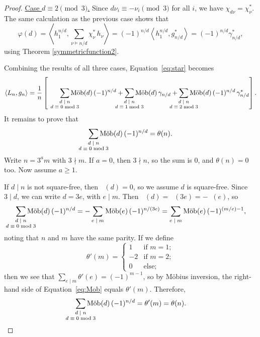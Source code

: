 \documentclass[12pt]{article}
\DeclareMathOperator{\mob}{M\ddot{o}b}
\newcommand{\gam}{\gamma}
\newcommand{\ee}{\chi}
\theoremstyle{definition}
\begin{document}
\begin{proof}
\noindent\underline{Case $d \equiv 2 \pmod{3}$.} Since $d\nu_i \equiv -\nu_i \pmod{3}$ for all $i$, we have $\ee_{d\nu} = \ee_{\nu}^*$. The same calculation as the previous case shows that
\[ \varphi(d) = \left\langle h_1^{n/d}, \sum_{\nu \vDash n/d} \ee_\nu^* \,h_\nu \right\rangle = (-1)^{n/d} \left\langle h_1^{n/d}, g_{n/d}^* \right\rangle= (-1)^{n/d} \gam_{n/d}^*, \]
using Theorem \ref{symmetricfunction2}.

Combining the results of all three cases, Equation~\eqref{eq:star} becomes
\[ \left\langle L_n, g_n \right\rangle = \frac{1}{n} \left[ \hspace{.25in} \sum_{\mathclap{\substack{\text{$d \mid n$}\\ \text{$d \equiv 0\bmod 3$}}}} \mob(d)\,(-1)^{n/d} + \sum_{\mathclap{\substack{\text{$d \mid n$}\\ \text{$d \equiv 1\bmod 3$}}}} \mob(d)\, \gam_{n/d} + \sum_{\mathclap{\substack{\text{$d \mid n$}\\ \text{$d \equiv 2\bmod 3$}}}} \mob(d)\, (-1)^{n/d}\, \gam_{n/d}^*\right]. \]
It remains to prove that
\[ \sum_{\mathclap{\substack{\text{$d \mid n$}\\ \text{$d \equiv 0\bmod 3$}}}} \mob(d)\,(-1)^{n/d} = \theta(n). \]
Write $n = 3^a m$ with $3\nmid m$. If $a = 0$, then $3\nmid n$, so the sum is $0$, and $\theta(n) = 0$ too. Now assume $a \ge 1$.

If $d \mid n$ is not square-free, then $\mob(d) = 0$, so we assume $d$ is square-free. Since $3\mid d$, we can write $d = 3e$, with $e \mid m$. Then $\mob(d) = \mob(3e) = -\mob(e)$, so
\begin{equation} \sum_{\mathclap{\substack{\text{$d \mid n$}\\ \text{$d \equiv 0\bmod 3$}}}} \mob(d)\,(-1)^{n/d} = -\sum_{\text{$e \mid m$}} \mob(e)\,(-1)^{n/(3e)} = \sum_{\text{$e \mid m$}} \mob(e)\,(-1)^{(m/e)-1}, \label{eq:Mob}\end{equation}
noting that $n$ and $m$ have the same parity. If we define
\[ \theta'(m) = \begin{cases}
1 & \text{if $m = 1$}; \\
-2 & \text{if $m = 2$}; \\
0 & \text{else};
\end{cases} \]
then we see that $\sum_{\text{$e\mid m$}} \theta'(e) = (-1)^{m-1}$, so by M\"obius inversion, the right-hand side of Equation~\eqref{eq:Mob} equals $\theta'(m)$.
Therefore,
\[ \sum_{\mathclap{\substack{\text{$d \mid n$}\\ \text{$d \equiv 0\bmod 3$}}}} \mob(d)\,(-1)^{n/d} = \theta'(m) = \theta(n). \qedhere \]
\end{proof}
\end{document}
